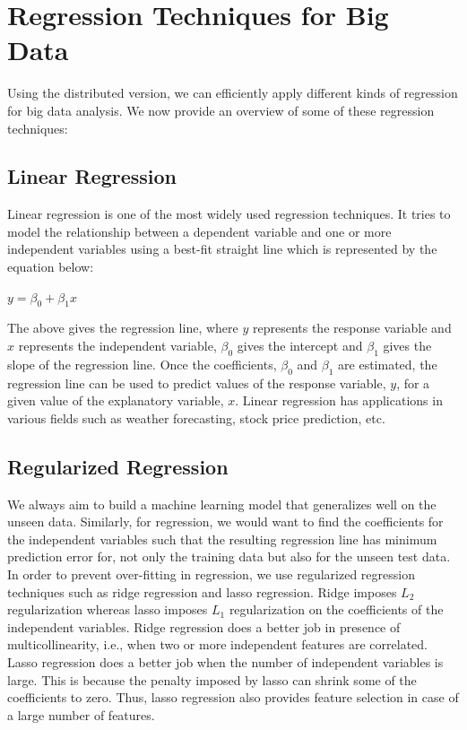 \documentclass[sigconf]{acmart}
\begin{document}
\section{Regression Techniques for Big Data}

Using the distributed version, we can efficiently apply different kinds of regression for big data analysis. We now provide an overview of some of these regression techniques:

\subsection{Linear Regression}
Linear regression is one of the most widely used regression techniques. It tries to model the relationship between a dependent variable and one or more independent variables using a best-fit straight line which is represented by the equation below:
\begin{center} $y = \beta_0 + \beta_1 x$ \end{center}
The above gives the regression line, where $y$ represents the response variable and $x$ represents the independent variable, $\beta_0$ gives the intercept and $\beta_1$ gives the slope of the regression line. Once the coefficients, $\beta_0$ and $\beta_1$ are estimated, the regression line can be used to predict values of the response variable, $y$, for a given value of the explanatory variable, $x$. Linear regression has applications in various fields such as weather forecasting, stock price prediction, etc.

\subsection{Regularized Regression}
We always aim to build a machine learning model that generalizes well on the unseen data. Similarly, for regression, we would want to find the coefficients for the independent variables such that the resulting regression line has minimum prediction error for, not only the training data but also for the unseen test data. In order to prevent over-fitting in regression, we use regularized regression techniques such as ridge regression and lasso regression. Ridge imposes $L_2$ regularization whereas lasso imposes $L_1$ regularization on the coefficients of the independent variables. Ridge regression does a better job in presence of multicollinearity, i.e., when two or more independent features are correlated. Lasso regression does a better job when the number of independent variables is large. This is because the penalty imposed by lasso can shrink some of the coefficients to zero. Thus, lasso regression also provides feature selection in case of a large number of features.
\end{document}
